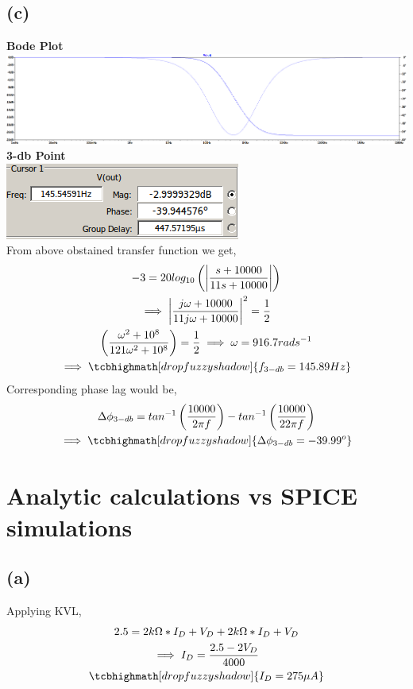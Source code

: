 \documentclass{article}
\begin{document}
\subsection*{(c)}
\textbf{Bode Plot}\\
\includegraphics[scale=0.28]{./figs/Q1_c.png}\\
 \newline
\textbf{3-db Point}\\
\includegraphics[scale=0.5]{./figs/Q1_c_1.png}\\
 \newline
From above obstained transfer function we get,\\
\begin{gather*}
-3 = 20log_{10}\left(\left|\frac{s + 10000}{11s + 10000}\right|\right)\\
\implies \left|\frac{j{\omega} + 10000}{11j{\omega} + 10000}\right| ^2 = \frac{1}{2}\\
\left(\frac{{\omega}^2 + 10^8}{121{\omega}^2 + 10^8}\right)= \frac{1}{2}
\implies \omega = 916.7 rad s^{-1}\\
\implies \tcbhighmath[drop fuzzy shadow]{f_{3-db} = 145.89 Hz} 
\end{gather*}
Corresponding phase lag would be,\\
\begin{gather*}
\Delta {\phi}_{3-db} = tan^{-1} \left(\frac{10000}{2{\pi}f}\right) - tan^{-1} \left(\frac{10000}{22{\pi}f}\right)\\
\implies \tcbhighmath[drop fuzzy shadow]{\Delta {\phi}_{3-db} = -39.99^o}
\end{gather*}

\section{Analytic calculations vs SPICE simulations}
\subsection*{(a)}
Applying KVL,\\
\begin{gather*}
2.5 = 2k{\si{\ohm}}*I_D + V_D + 2k{\si{\ohm}}*I_D + V_D\\
\implies I_D = \frac{2.5 - 2V_D}{4000}\\
\tcbhighmath[drop fuzzy shadow]{I_D = 275{\mu}A}
\end{gather*}
\end{document}

